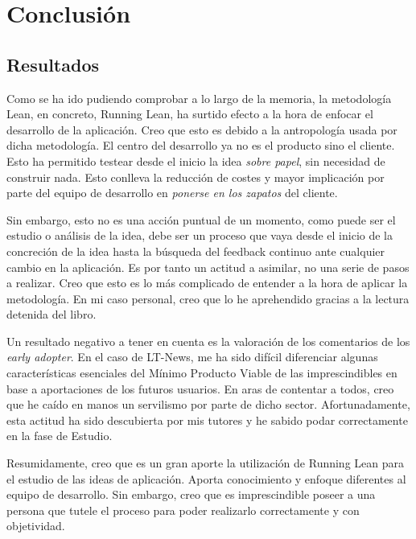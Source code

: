 
\chapter{Conclusión}\label{conclusion}

\section{Resultados}\label{sec:resultados}

Como se ha ido pudiendo comprobar a lo largo de la memoria, la metodología Lean, en concreto, Running Lean, ha surtido efecto a la hora de enfocar el desarrollo de la aplicación. Creo que esto es debido a la antropología usada por dicha metodología. El centro del desarrollo ya no es el producto sino el cliente. Esto ha permitido testear desde el inicio la idea \textit{sobre papel}, sin necesidad de construir nada. Esto conlleva la reducción de costes y mayor implicación por parte del equipo de desarrollo en \textit{ponerse en los zapatos} del cliente.

Sin embargo, esto no es una acción puntual de un momento, como puede ser el estudio o análisis de la idea, debe ser un proceso que vaya desde el inicio de la concreción de la idea hasta la búsqueda del feedback continuo ante cualquier cambio en la aplicación. Es por tanto un actitud a asimilar, no una serie de pasos a realizar. Creo que esto es lo más complicado de entender a la hora de aplicar la metodología. En mi caso personal, creo que lo he aprehendido gracias a la lectura detenida del libro.

Un resultado negativo a tener en cuenta es la valoración de los comentarios de los \textit{early adopter}. En el caso de LT-News, me ha sido difícil diferenciar algunas características esenciales del Mínimo Producto Viable de las imprescindibles en base a aportaciones de los futuros usuarios. En aras de contentar a todos, creo que he caído en manos un servilismo por parte de dicho sector. Afortunadamente, esta actitud ha sido descubierta por mis tutores y he sabido podar correctamente en la fase de Estudio.

Resumidamente, creo que es un gran aporte la utilización de Running Lean para el estudio de las ideas de aplicación. Aporta conocimiento y enfoque diferentes al equipo de desarrollo. Sin embargo, creo que es imprescindible poseer a una persona que tutele el proceso para poder realizarlo correctamente y con objetividad.

